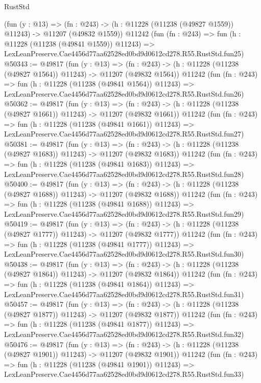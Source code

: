 \begin{lexlean}{RustStd}
\begin{coremodule}
    (fun (y : @13) =>
    (fn : @243) -> (h : @11228 (@11238 (@49827 @1559)) @11243) -> @11207 (@49832 @1559))
    @11242
    (fun (fn : @243) =>
    fun (h : @11228 (@11238 (@49841 @1559)) @11243) =>
    LexLeanPreserve.Cae4456d77aa62528ed0bd9d0612cd278.R55.RustStd.fun25)
@50343 := @49817
    (fun (y : @13) =>
    (fn : @243) -> (h : @11228 (@11238 (@49827 @1564)) @11243) -> @11207 (@49832 @1564))
    @11242
    (fun (fn : @243) =>
    fun (h : @11228 (@11238 (@49841 @1564)) @11243) =>
    LexLeanPreserve.Cae4456d77aa62528ed0bd9d0612cd278.R55.RustStd.fun26)
@50362 := @49817
    (fun (y : @13) =>
    (fn : @243) -> (h : @11228 (@11238 (@49827 @1661)) @11243) -> @11207 (@49832 @1661))
    @11242
    (fun (fn : @243) =>
    fun (h : @11228 (@11238 (@49841 @1661)) @11243) =>
    LexLeanPreserve.Cae4456d77aa62528ed0bd9d0612cd278.R55.RustStd.fun27)
@50381 := @49817
    (fun (y : @13) =>
    (fn : @243) -> (h : @11228 (@11238 (@49827 @1683)) @11243) -> @11207 (@49832 @1683))
    @11242
    (fun (fn : @243) =>
    fun (h : @11228 (@11238 (@49841 @1683)) @11243) =>
    LexLeanPreserve.Cae4456d77aa62528ed0bd9d0612cd278.R55.RustStd.fun28)
@50400 := @49817
    (fun (y : @13) =>
    (fn : @243) -> (h : @11228 (@11238 (@49827 @1688)) @11243) -> @11207 (@49832 @1688))
    @11242
    (fun (fn : @243) =>
    fun (h : @11228 (@11238 (@49841 @1688)) @11243) =>
    LexLeanPreserve.Cae4456d77aa62528ed0bd9d0612cd278.R55.RustStd.fun29)
@50419 := @49817
    (fun (y : @13) =>
    (fn : @243) -> (h : @11228 (@11238 (@49827 @1777)) @11243) -> @11207 (@49832 @1777))
    @11242
    (fun (fn : @243) =>
    fun (h : @11228 (@11238 (@49841 @1777)) @11243) =>
    LexLeanPreserve.Cae4456d77aa62528ed0bd9d0612cd278.R55.RustStd.fun30)
@50438 := @49817
    (fun (y : @13) =>
    (fn : @243) -> (h : @11228 (@11238 (@49827 @1864)) @11243) -> @11207 (@49832 @1864))
    @11242
    (fun (fn : @243) =>
    fun (h : @11228 (@11238 (@49841 @1864)) @11243) =>
    LexLeanPreserve.Cae4456d77aa62528ed0bd9d0612cd278.R55.RustStd.fun31)
@50457 := @49817
    (fun (y : @13) =>
    (fn : @243) -> (h : @11228 (@11238 (@49827 @1877)) @11243) -> @11207 (@49832 @1877))
    @11242
    (fun (fn : @243) =>
    fun (h : @11228 (@11238 (@49841 @1877)) @11243) =>
    LexLeanPreserve.Cae4456d77aa62528ed0bd9d0612cd278.R55.RustStd.fun32)
@50476 := @49817
    (fun (y : @13) =>
    (fn : @243) -> (h : @11228 (@11238 (@49827 @1901)) @11243) -> @11207 (@49832 @1901))
    @11242
    (fun (fn : @243) =>
    fun (h : @11228 (@11238 (@49841 @1901)) @11243) =>
    LexLeanPreserve.Cae4456d77aa62528ed0bd9d0612cd278.R55.RustStd.fun33)

\end{coremodule}
\end{lexlean}
